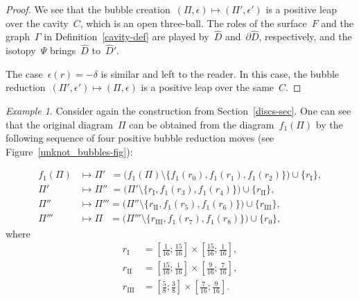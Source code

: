 \documentclass{amsart}
\theoremstyle{theorem}
\theoremstyle{remark}
\newtheorem{exam}[theo]{Example}
\theoremstyle{definition}
\numberwithin{equation}{section}
\numberwithin{figure}{section}
\begin{document}
\begin{proof}
We see that the bubble creation~$(\Pi,\epsilon)\mapsto(\Pi',\epsilon')$ is a positive leap over the cavity~$C$, which is an open three-ball.
The roles of the surface~$F$ and the graph~$\Gamma$ in Definition~\ref{cavity-def} are played by~$\widehat D$
and~$\partial\widehat D$, respectively, and the isotopy~$\Psi$ brings~$\widehat D$ to~$\widehat D'$.

The case~$\epsilon(r)=-\delta$ is similar and left to the reader. In this case, the bubble reduction~$(\Pi',\epsilon')\mapsto(\Pi,\epsilon)$
is a positive leap over the same~$C$.
\end{proof}

\begin{exam}
Consider again the construction from Section~\ref{discs-sec}. One can see that the original diagram~$\Pi$
can be obtained from the diagram~$f_1(\Pi)$ by the following sequence of four positive bubble reduction moves (see Figure~\ref{unknot_bubbles-fig}):

$$\begin{aligned}
f_1(\Pi)&\mapsto\Pi'\phantom{''} = \bigl(f_1(\Pi)\setminus\{f_1(r_0), f_1(r_1), f_1(r_2)\}\bigr)\cup\{r_{\mathrm{I}}\},\\
\Pi'&\mapsto\Pi''\phantom' = \bigl(\Pi'\setminus\{r_{\mathrm I}, f_1(r_3), f_1(r_4)\}\bigr)\cup\{r_{\mathrm{II}}\},\\
\Pi''&\mapsto\Pi''' = \bigl(\Pi''\setminus\{r_{\mathrm{II}}, f_1(r_5), f_1(r_6)\}\bigr)\cup\{r_{\mathrm{III}}\},\\
\Pi'''&\mapsto\Pi\phantom{'''} = \bigl(\Pi'''\setminus\{r_{\mathrm{III}}, f_1(r_7),f_1(r_8)\}\bigr)\cup\{r_0\},
\end{aligned}$$
where
$$\begin{aligned}
r_{\mathrm I}&=\left[\frac{1}{16}; \frac{15}{16}\right]\times\left[\frac{15}{16}; \frac{1}{16}\right],\\
r_{\mathrm{II}}&=\left[\frac{15}{16}; \frac{1}{16}\right]\times\left[\frac{9}{16}; \frac{7}{16}\right],\\
r_{\mathrm{III}}&=\left[\frac{5}{8}; \frac{3}{8}\right]\times\left[\frac{7}{16}; \frac{9}{16}\right].
\end{aligned}$$

\end{exam}
\end{document}
